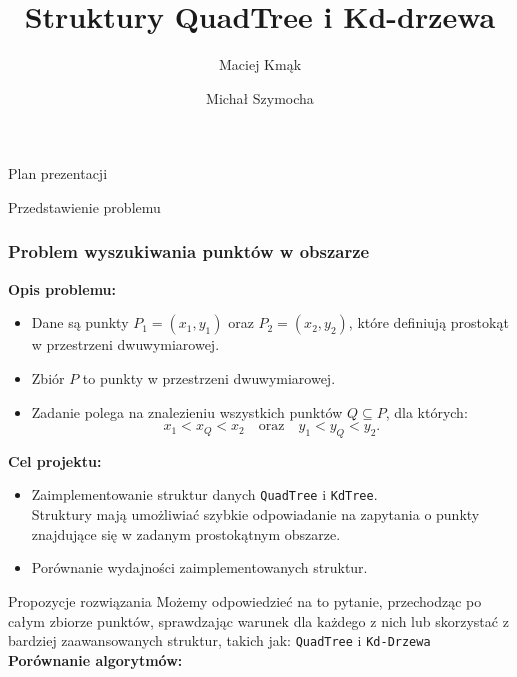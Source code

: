\documentclass[aspectratio=1610, polish]{beamer}
\author[Maciej Kmąk \& Michał Szymocha]{Maciej Kmąk \and Michał Szymocha}
\date{}
\title{Struktury QuadTree i Kd-drzewa}
\institute[AGH]{
        Wydział Informatyki AGH
}
\begin{document}
\begin{frame}[t]
    \maketitle
\end{frame}

\begin{frame}{Plan prezentacji}
    \tableofcontents
\end{frame}

\begin{section}{Przedstawienie problemu}
    
\begin{frame}
    \frametitle{Problem wyszukiwania punktów w obszarze}
    \textbf{Opis problemu:}
    \begin{itemize}
        \item Dane są punkty $P_1 = (x_1, y_1)$ oraz $P_2 = (x_2, y_2)$, które definiują prostokąt w przestrzeni dwuwymiarowej.
        \item Zbiór $P$ to punkty w przestrzeni dwuwymiarowej.
        \item Zadanie polega na znalezieniu wszystkich punktów $Q \subseteq P$, dla których:
        \[
        x_1 < x_Q < x_2 \quad \text{oraz} \quad y_1 < y_Q < y_2.
        \]
    \end{itemize}
    \pause
    \vspace{0.5cm}
    
    \textbf{Cel projektu:}
    \begin{itemize}
        \item Zaimplementowanie struktur danych \texttt{QuadTree} i \texttt{KdTree}.\\
            \biitem Struktury mają umożliwiać szybkie odpowiadanie na zapytania o punkty znajdujące się w zadanym prostokątnym obszarze.
        \item Porównanie wydajności zaimplementowanych struktur.
    \end{itemize}
\end{frame}

\begin{frame}{Propozycje rozwiązania}
Możemy odpowiedzieć na to pytanie, przechodząc po całym zbiorze punktów, sprawdzając warunek dla każdego z nich lub skorzystać z bardziej zaawansowanych struktur, takich jak: \texttt{QuadTree} i \texttt{Kd-Drzewa}
\pause
\vspace{0.5cm}
\\
\textbf{\large Porównanie algorytmów:}


\end{frame}
\end{section}
\end{document}
